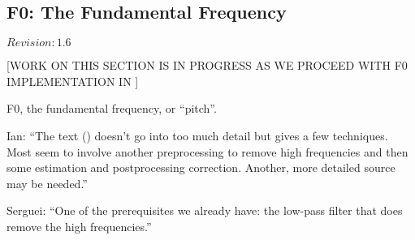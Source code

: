 \subsection{F0: The Fundamental Frequency}
\label{sect:f0}

$Revision: 1.6 $

[WORK ON THIS SECTION IS IN PROGRESS AS WE PROCEED WITH F0 IMPLEMENTATION IN {\marf}]

F0, the fundamental frequency, or ``pitch''.

Ian: ``The text (\cite{shaughnessy2000}) doesn't go into too much detail but gives a few techniques. Most
seem to involve another preprocessing to remove high frequencies and then
some estimation and postprocessing correction. Another, more detailed
source may be needed.''

Serguei: ``One of the prerequisites we already have: the low-pass filter that
does remove the high frequencies.''

